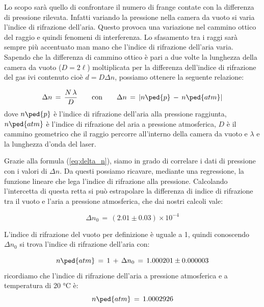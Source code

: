 Lo scopo sarà quello di confrontare il numero di frange contate con la differenza di pressione rilevata.
Infatti variando la pressione nella camera da vuoto si varia l'indice di rifrazione dell'aria.
Questo provoca una variazione nel cammino ottico del raggio  e quindi fenomeni di interferenza.
Lo sfasamento tra i raggi sarà sempre più accentuato man mano che l'indice di rifrazione dell'aria varia.
Sapendo che la differenza di cammino ottico è pari a due volte la lunghezza della camera da vuoto ($D = 2\ell$)
moltiplicata per la differenza dell'indice di rifrazione del gas ivi contenuto
cioè $d = D\Delta n$, possiamo ottenere la seguente relazione:

\begin{equation}
	\Delta{n} \,=\, \frac{N \, \lambda}{D} \qquad \text{con} \qquad \Delta{n} \,=\, |n\ped{p} \,-\, n\ped{atm}|
	\label{eq:delta_n}
\end{equation}
%
dove $n\ped{p}$ è l'indice di rifrazione dell'aria alla pressione raggiunta, $n\ped{atm}$ è l'indice di rifrazione del aria a pressione atmosferica, $D$ è il cammino geometrico che il raggio percorre all'interno della camera da vuoto e $\lambda$ e la lunghezza d'onda del laser.

Grazie alla formula (\ref{eq:delta_n}), siamo in grado di correlare i dati di pressione con i valori di $\Delta n$. Da questi possiamo
ricavare, mediante una regressione, la funzione lineare che lega l'indice di rifrazione alla pressione.
Calcolando l'intercetta di questa retta si può estrapolare la differenza di indice di rifrazione tra il vuoto e l'aria a pressione
atmosferica, che dai nostri calcoli vale:

\begin{equation}
    \Delta n_0 \,=\, (2.01 \pm 0.03) \times 10^{-4}
\end{equation}

L'indice di rifrazione del vuoto per definizione è uguale a 1, quindi conoscendo $\Delta n_0$ si trova l'indice di rifrazione dell'aria con:

\begin{equation}
	n\ped{atm} \,=\, 1 \,+\, \Delta n_0 \,=\, 1.000201 \pm 0.000003 
	\label{eq:indice_rif_aria}
\end{equation}
%
ricordiamo che l'indice di rifrazione dell'aria a pressione atmosferica e a temperatura di 20 $\si{\degreeCelsius}$ è:
\begin{equation}
n\ped{atm} \, = \, 1.000 292 6
\end{equation}

